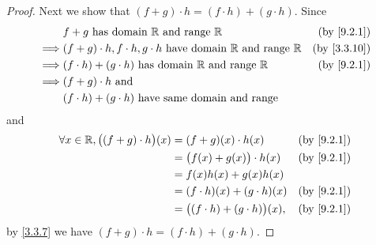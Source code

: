 \begin{proof}
  Next we show that \((f + g) \cdot h = (f \cdot h) + (g \cdot h)\).
  Since
  \begin{align*}
             & f + g \text{ has domain } \R \text{ and range } \R                                   & \text{(by \cref{9.2.1})}  \\
    \implies & (f + g) \cdot h, f \cdot h, g \cdot h  \text{ have domain } \R \text{ and range } \R & \text{(by \cref{3.3.10})} \\
    \implies & (f \cdot h) + (g \cdot h)  \text{ has domain } \R \text{ and range } \R              & \text{(by \cref{9.2.1})}  \\
    \implies & (f + g) \cdot h \text{ and }                                                                                     \\
             & (f \cdot h) + (g \cdot h) \text{ have same domain and range}
  \end{align*}
  and
  \begin{align*}
    \forall x \in \R, \big((f + g) \cdot h\big)(x) & = (f + g)(x) \cdot h(x)                   & \text{(by \cref{9.2.1})} \\
                                                   & = \big(f(x) + g(x)\big) \cdot h(x)        & \text{(by \cref{9.2.1})} \\
                                                   & = f(x)h(x) + g(x)h(x)                                                \\
                                                   & = (f \cdot h)(x) + (g \cdot h)(x)         & \text{(by \cref{9.2.1})} \\
                                                   & = \big((f \cdot h) + (g \cdot h)\big)(x), & \text{(by \cref{9.2.1})}
  \end{align*}
  by \cref{3.3.7} we have \((f + g) \cdot h = (f \cdot h) + (g \cdot h)\).


\end{proof}
